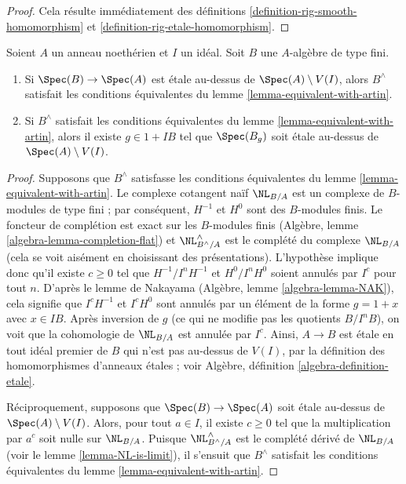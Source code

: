 \begin{proof}
Cela résulte immédiatement des définitions
\ref{definition-rig-smooth-homomorphism} et
\ref{definition-rig-etale-homomorphism}.
\end{proof}

\begin{lemma}
\label{lemma-rig-etale}
Soient $A$ un anneau noethérien et $I$ un idéal. Soit $B$ une $A$-algèbre de
type fini.
\begin{enumerate}
\item Si $\Spec(B) \to \Spec(A)$ est étale au-dessus de
$\Spec(A) \setminus V(I)$, alors $B^\wedge$ satisfait les conditions
équivalentes du lemme \ref{lemma-equivalent-with-artin}.
\item Si $B^\wedge$ satisfait les conditions équivalentes du lemme
\ref{lemma-equivalent-with-artin}, alors il existe $g \in 1 + IB$ tel que
$\Spec(B_g)$ soit étale au-dessus de $\Spec(A) \setminus V(I)$.
\end{enumerate}
\end{lemma}

\begin{proof}
Supposons que $B^\wedge$ satisfasse les conditions équivalentes du lemme
\ref{lemma-equivalent-with-artin}. Le complexe cotangent naïf $\NL_{B/A}$ est
un complexe de $B$-modules de type fini ; par conséquent, $H^{-1}$ et $H^0$
sont des $B$-modules finis. Le foncteur de complétion est exact sur les
$B$-modules finis (Algèbre, lemme \ref{algebra-lemma-completion-flat}) et
$\NL_{B^\wedge/A}^\wedge$ est le complété du complexe $\NL_{B/A}$ (cela se
voit aisément en choisissant des présentations). L'hypothèse implique donc
qu'il existe $c \geq 0$ tel que $H^{-1}/I^nH^{-1}$ et $H^0/I^nH^0$ soient
annulés par $I^c$ pour tout $n$. D'après le lemme de Nakayama (Algèbre, lemme
\ref{algebra-lemma-NAK}), cela signifie que $I^cH^{-1}$ et $I^cH^0$ sont
annulés par un élément de la forme $g = 1 + x$ avec $x \in IB$. Après
inversion de $g$ (ce qui ne modifie pas les quotients $B/I^nB$), on voit que
la cohomologie de $\NL_{B/A}$ est annulée par $I^c$. Ainsi, $A \to B$ est
étale en tout idéal premier de $B$ qui n'est pas au-dessus de $V(I)$, par la
définition des homomorphismes d'anneaux étales ; voir Algèbre, définition
\ref{algebra-definition-etale}.

\medskip\noindent
Réciproquement, supposons que $\Spec(B) \to \Spec(A)$ soit étale au-dessus de
$\Spec(A) \setminus V(I)$. Alors, pour tout $a \in I$, il existe $c \geq 0$
tel que la multiplication par $a^c$ soit nulle sur $\NL_{B/A}$. Puisque
$\NL_{B^\wedge/A}^\wedge$ est le complété dérivé de $\NL_{B/A}$ (voir le lemme
\ref{lemma-NL-is-limit}), il s'ensuit que $B^\wedge$ satisfait les conditions
équivalentes du lemme \ref{lemma-equivalent-with-artin}.
\end{proof}

